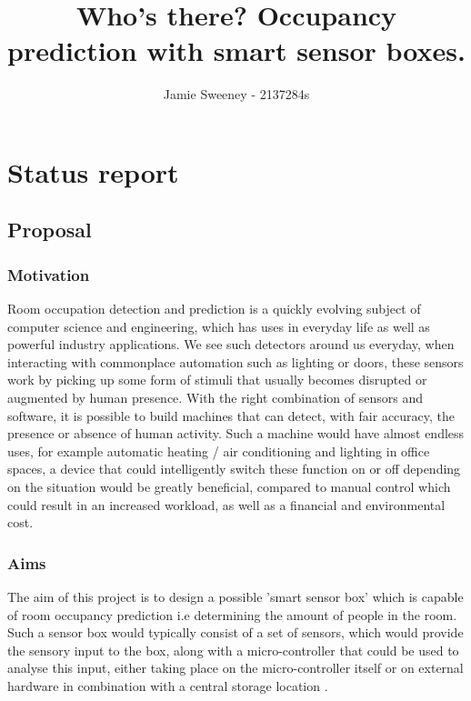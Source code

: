 \documentclass[11pt]{article}
\title{Who's there? Occupancy prediction with smart sensor boxes.}
\author{Jamie Sweeney - 2137284s}
\begin{document}
    \maketitle

\medskip
    
\section{Status report}

\subsection{Proposal}\label{proposal}

\subsubsection{Motivation}\label{motivation}
Room occupation detection and prediction is a quickly evolving subject of computer science and engineering, which has uses in everyday life as well as powerful industry applications. We see such detectors around us everyday, when interacting with commonplace automation such as lighting or doors, these sensors work by picking up some form of stimuli that usually becomes disrupted or augmented by human presence. With the right combination of sensors and software, it is possible to build machines that can detect, with fair accuracy, the presence or absence of human activity. Such a machine would have almost endless uses, for example automatic heating / air conditioning and lighting in office spaces, a device that could intelligently switch these function on or off depending on the situation would be greatly beneficial, compared to manual control which could result in an increased workload, as well as a financial and environmental cost.

\subsubsection{Aims}\label{aims}
The aim of this project is to design a possible 'smart sensor box' which is capable of room occupancy prediction i.e determining the amount of people in the room. Such a sensor box would typically consist of a set of sensors, which would provide the sensory input to the box, along with a micro-controller that could be used to analyse this input, either taking place on the micro-controller itself or on external hardware in combination with a central storage location \cite{ref1}.
\end{document}
